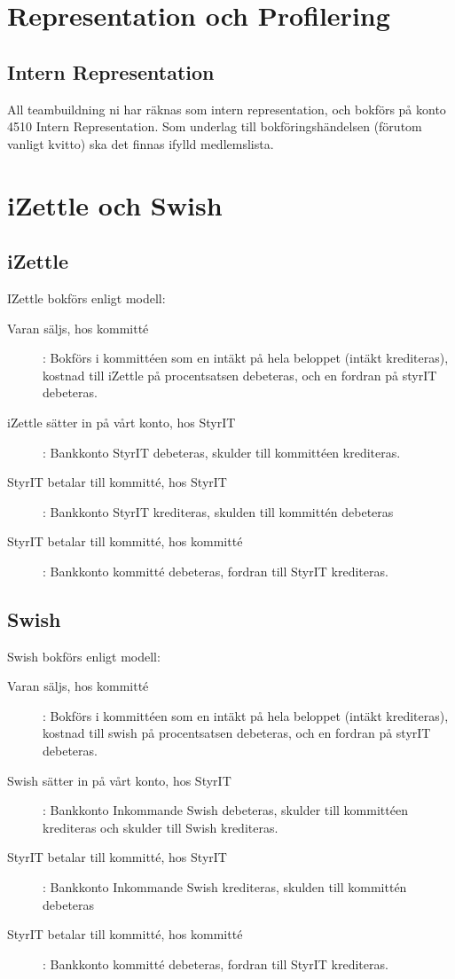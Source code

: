 \documentclass{article}
\begin{document}
\section{Representation och Profilering}
\subsection{Intern Representation}
All teambuildning ni har räknas som intern representation, och bokförs på konto 4510 Intern Representation. Som underlag till bokföringshändelsen (förutom vanligt kvitto) ska det finnas ifylld medlemslista. 

\section{iZettle och Swish}
\subsection{iZettle}
IZettle bokförs enligt modell: 
\begin{description}
    \item [Varan säljs, hos kommitté]: Bokförs i kommittéen som en intäkt på hela beloppet (intäkt krediteras), kostnad till iZettle på procentsatsen debeteras, och en fordran på styrIT debeteras. 
    \item [iZettle sätter in på vårt konto, hos StyrIT]: Bankkonto StyrIT debeteras, skulder till kommittéen krediteras. 
    \item [StyrIT betalar till kommitté, hos StyrIT]: Bankkonto StyrIT krediteras, skulden till kommittén debeteras
    \item [StyrIT betalar till kommitté, hos kommitté]: Bankkonto kommitté debeteras, fordran till StyrIT krediteras.
\end{description}
\subsection{Swish}
Swish bokförs enligt modell: 
\begin{description}
    \item [Varan säljs, hos kommitté]: Bokförs i kommittéen som en intäkt på hela beloppet (intäkt krediteras), kostnad till swish på procentsatsen debeteras, och en fordran på styrIT debeteras. 
    \item [Swish sätter in på vårt konto, hos StyrIT]: Bankkonto Inkommande Swish debeteras, skulder till kommittéen krediteras och skulder till Swish krediteras. 
    \item [StyrIT betalar till kommitté, hos StyrIT]: Bankkonto Inkommande Swish krediteras, skulden till kommittén debeteras
    \item [StyrIT betalar till kommitté, hos kommitté]: Bankkonto kommitté debeteras, fordran till StyrIT krediteras.
\end{description}
\end{document}
